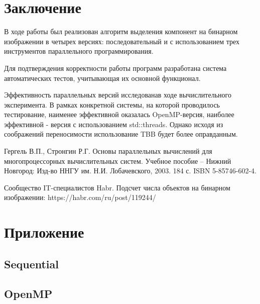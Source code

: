 \documentclass{report}
\begin{document}
\section*{Заключение}
В ходе работы был реализован алгоритм выделения компонент на бинарном изображении в четырех версиях: последовательный и с использованием трех инструментов параллельного программирования.
\par Для подтверждения корректности работы программ разработана система автоматических тестов, учитывающая их основной функционал.
\par Эффективность параллельных версий исследованав ходе вычислительного эксперимента. В рамках конкретной системы, на которой проводилось тестирование, наименее эффективной оказалась OpenMP-версия, наиболее эффективной - версия с использованием std::threads. Однако исходя из соображений переносимости использование TBB будет более оправданным.

\newpage

\begin{thebibliography}{1}

 Гергель В.П., Стронгин Р.Г. Основы параллельных вычислений для многопроцессорных вычислительных систем. Учебное пособие – Нижний Новгород: Изд-во ННГУ им. Н.И. Лобачевского, 2003. 184 с. ISBN 5-85746-602-4. 

 Сообщество IT-специалистов Habr. Подсчет числа объектов на бинарном изображении: 
https://habr.com/ru/post/119244/

\end{thebibliography}
\newpage

\section*{Приложение}
\subsection*{Sequential}
	
	
	
\subsection*{OpenMP}



\end{document}
